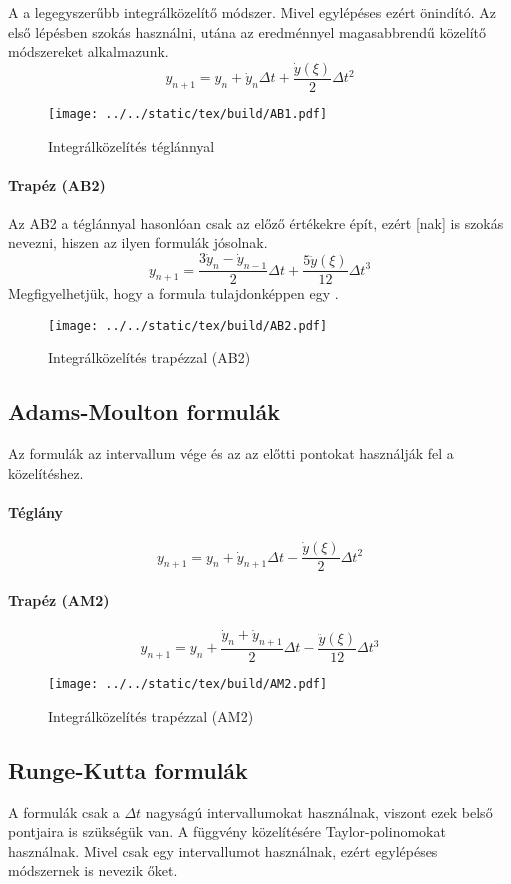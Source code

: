 \documentclass[../../main.tex]{subfiles}
\begin{document}
A  a legegyszerűbb integrálközelítő módszer. Mivel egylépéses ezért
önindító. Az első lépésben szokás használni, utána az eredménnyel magasabbrendű
közelítő módszereket alkalmazunk.
\[
  y_{n + 1}
  = y_n + \dot y_n \Delta t
  + \frac{\dot y(\xi)}{2} \Delta t^2
\]
\begin{figure}[H]
  \centering
  \texttt{[image: ../../static/tex/build/AB1.pdf]}
  \caption{Integrálközelítés téglánnyal}
  \label{fig:AB1}
\end{figure}

\paragraph{Trapéz (AB2)}

Az AB2  a téglánnyal hasonlóan csak az előző értékekre épít,
ezért [nak] is szokás nevezni, hiszen az ilyen formulák jósolnak.
\[
  y_{n+1}
  = \frac{3 \dot y_n - \dot y_{n-1}}{2} \Delta t
  + \frac{5 \ddot y(\xi)}{12} \Delta t^3
\]
Megfigyelhetjük, hogy a formula tulajdonképpen egy .

\begin{figure}[H]
  \centering
  \texttt{[image: ../../static/tex/build/AB2.pdf]}
  \caption{Integrálközelítés trapézzal (AB2)}
  \label{fig:AB2}
\end{figure}

\subsection{Adams-Moulton formulák}

Az  formulák az intervallum vége és az az előtti pontokat
használják fel a közelítéshez.

\paragraph{Téglány}
\[
  y_{n + 1}
  = y_n
  + \dot y_{n + 1} \Delta t
  - \frac{\dot y(\xi)}{2} \Delta t^2
\]

\paragraph{Trapéz (AM2)}
\[
  y_{n + 1}
  = y_n
  + \frac{\dot y_n + \dot y_{n + 1}}{2} \Delta t
  - \frac{\ddot y(\xi)}{12} \Delta t^3
\]

\begin{figure}[H]
  \centering
  \texttt{[image: ../../static/tex/build/AM2.pdf]}
  \caption{Integrálközelítés trapézzal (AM2)}
  \label{fig:AM2}
\end{figure}


\subsection{Runge-Kutta formulák}

A  formulák csak a $\Delta t$ nagyságú intervallumokat
használnak, viszont ezek belső pontjaira is szükségük van. A függvény
közelítésére Taylor-polinomokat használnak. Mivel csak egy intervallumot
használnak, ezért egylépéses módszernek is nevezik őket.
\end{document}
